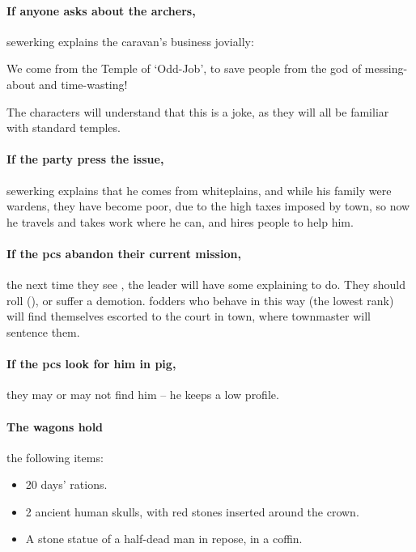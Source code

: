 \paragraph{If anyone asks about the archers,}
\gls{sewerking} explains the caravan's business jovially:

\null
\begin{speechtext}
  We come from the Temple of `Odd-Job', to save people from the god of messing-about and time-wasting!
\end{speechtext}

The characters will understand that this is a joke, as they will all be familiar with standard temples.

\paragraph{If the party press the issue,}
\gls{sewerking} explains that he comes from \gls{whiteplains}, and while his family were \glspl{warden}, they have become poor, due to the high taxes imposed by \gls{town}, so now he travels and takes work where he can, and hires people to help him.

\paragraph{If the \glspl{pc} abandon their current mission,}
the next time they see , the leader will have some explaining to do.
They should roll  (\tn[12]), or suffer a demotion.
\Glspl{fodder} who behave in this way (the lowest rank) will find themselves escorted to the \gls{court} in \gls{town}, where \gls{townmaster} will sentence them.

\paragraph{If the \glspl{pc} look for him in \gls{pig},}
they may or may not find him -- he keeps a low profile.

\paragraph{The wagons hold}
the following items:

\null
\begin{itemize}
  \item
  20 days' rations.
  \item
  2 ancient human skulls, with red stones inserted around the crown.
  \label{skullCrown}
  \item
  A stone statue of a half-dead man in repose, in a coffin.
\end{itemize}

